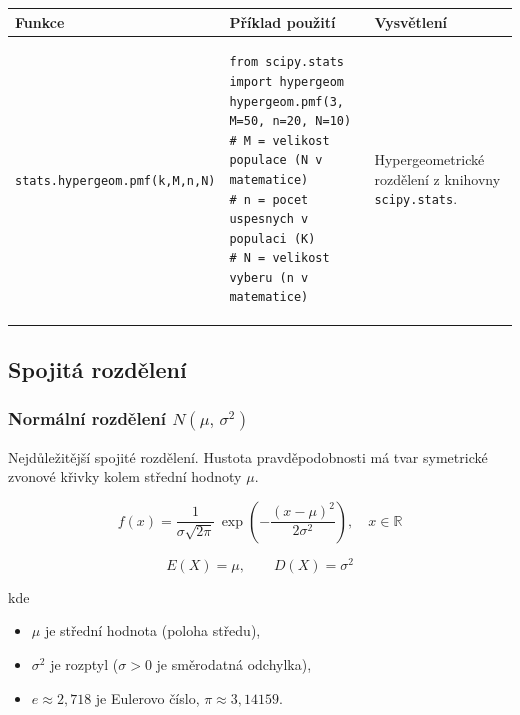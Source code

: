 \documentclass[a4paper, 11pt]{article}
\newenvironment{funkcedict}
{%
  \begingroup
  \renewcommand{\arraystretch}{1.4}%
  \lstset{basicstyle=\ttfamily\small, columns=fullflexible}%
  \setlength{\tabcolsep}{4pt}%
  \begin{tabular}{p{0.19\textwidth} p{0.38\textwidth} p{0.30\textwidth}}
  \textbf{Funkce} & \textbf{Příklad použití} & \textbf{Vysvětlení} \\
  \midrule
}
{%
  \end{tabular}%
  \endgroup
}
\begin{document}
\begin{funkcedict}

	\texttt{stats.hypergeom.\allowbreak pmf(k,M,n,N)} &
	\begin{lstlisting}
from scipy.stats import hypergeom
hypergeom.pmf(3, M=50, n=20, N=10)
# M = velikost populace (N v matematice)
# n = pocet uspesnych v populaci (K)
# N = velikost vyberu (n v matematice)
	\end{lstlisting}
	&
	Hypergeometrické rozdělení z knihovny \texttt{scipy.stats}. \\

\end{funkcedict}

\subsection{Spojitá rozdělení}

\subsubsection{Normální rozdělení $N(\mu,\,\sigma^2)$}

Nejdůležitější spojité rozdělení. Hustota pravděpodobnosti má tvar symetrické
zvonové křivky kolem střední hodnoty $\mu$.

\begin{equation*}
	f(x) = \frac{1}{\sigma\sqrt{2\pi}}\,\exp\!\left(-\frac{(x-\mu)^2}{2\sigma^2}\right),
	\quad x \in \mathbb{R}
\end{equation*}

\begin{equation*}
	E(X) = \mu, \qquad D(X) = \sigma^2
\end{equation*}

kde

\begin{itemize}[noitemsep]
	\item $\mu$ je střední hodnota (poloha středu),
	\item $\sigma^2$ je rozptyl ($\sigma > 0$ je směrodatná odchylka),
	\item $e \approx 2{,}718$ je Eulerovo číslo, $\pi \approx 3{,}14159$.
\end{itemize}

\begin{center}
\end{center}
\end{document}
